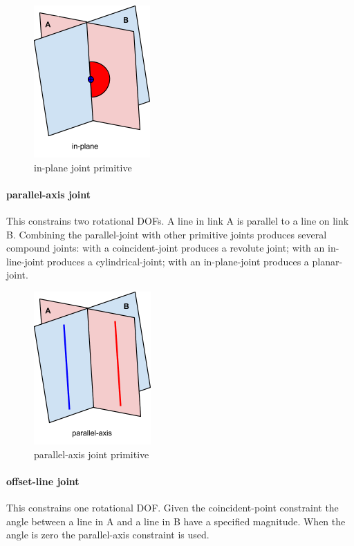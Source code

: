 \documentclass[]{report}
\begin{document}
\begin{figure}[ht!]
	\centering
	\includegraphics[scale=0.7]{images/image15.png}
	\caption{in-plane joint primitive}
	\label{fig:in-plane-primitive}
\end{figure} 

\paragraph{parallel-axis joint}

This constrains two rotational DOFs. 
A line in link A is parallel to a line on link B. 
Combining the parallel-joint with other primitive joints produces several compound joints: 
with a coincident-joint produces a revolute joint; 
with an in-line-joint produces a cylindrical-joint; 
with an in-plane-joint produces a planar-joint.

\begin{figure}[ht!]
	\centering
	\includegraphics[scale=0.7]{images/image05.png}
	\caption{parallel-axis joint primitive}
	\label{fig:parallel-axis-primitive}
\end{figure}

\paragraph{offset-line joint}

This constrains one rotational DOF. 
Given the coincident-point constraint the angle between a line in A and 
a line in B have a specified magnitude. 
When the angle is zero the parallel-axis constraint is used.
\end{document}
